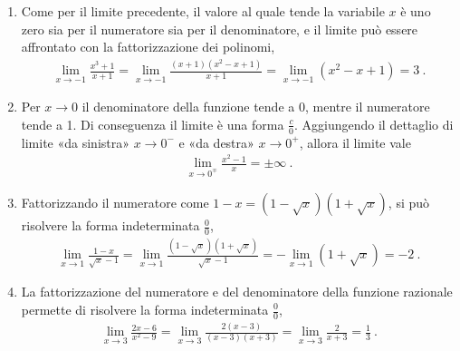 \documentclass[letterpaper,10pt,italian]{jupyterBook}
\begin{document}
\begin{enumerate}
\begin{equation*}
\begin{split}\lim_{x \to 2} \frac{x^2-4}{x-2} = 4 \ .\end{split}
\end{equation*}
\item {} 
\sphinxAtStartPar
Come per il limite precedente, il valore al quale tende la variabile \(x\) è uno zero sia per il numeratore sia per il denominatore, e il limite può essere affrontato con la fattorizzazione dei polinomi,
\begin{equation*}
\begin{split}\lim_{x \to -1} \frac{x^3+1}{x+1} = \lim_{x \to -1} \frac{(x+1)(x^2-x+1)}{x+1} = \lim_{x \to -1} \left( x^2-x+1 \right) = 3 \ .\end{split}
\end{equation*}
\item {} 
\sphinxAtStartPar
Per \(x \to 0\) il denominatore della funzione tende a \(0\), mentre il numeratore tende a \sphinxhyphen{}1. Di conseguenza il limite è una forma \(\frac{c}{0}\). Aggiungendo il dettaglio di limite «da sinistra» \(x \to 0^-\) e «da destra» \(x \to 0^+\), allora il limite vale
\begin{equation*}
\begin{split}\lim_{x \to 0^{\mp}} \frac{x^2 - 1}{x} = \pm \infty \ .\end{split}
\end{equation*}
\item {} 
\sphinxAtStartPar
Fattorizzando il numeratore come \(1 - x = (1-\sqrt{x})(1+\sqrt{x})\), si può risolvere la forma indeterminata \(\frac{0}{0}\),
\begin{equation*}
\begin{split}\lim_{x \to 1} \frac{1-x}{\sqrt{x}-1} = \lim_{x \to 1} \frac{(1-\sqrt{x})(1+\sqrt{x})}{\sqrt{x}-1} = - \lim_{x \to 1} (1+\sqrt{x}) = - 2 \ .\end{split}
\end{equation*}
\item {} 
\sphinxAtStartPar
La fattorizzazione del numeratore e del denominatore della funzione razionale permette di risolvere la forma indeterminata \(\frac{0}{0}\),
\begin{equation*}
\begin{split}\lim_{x \to 3} \frac{2x - 6}{x^2 - 9} = \lim_{x \to 3} \frac{2(x-3)}{(x-3)(x+3)} = \lim_{x \to 3} \frac{2}{x+3} = \frac{1}{3} \ .\end{split}
\end{equation*}

\end{enumerate}
\end{document}
